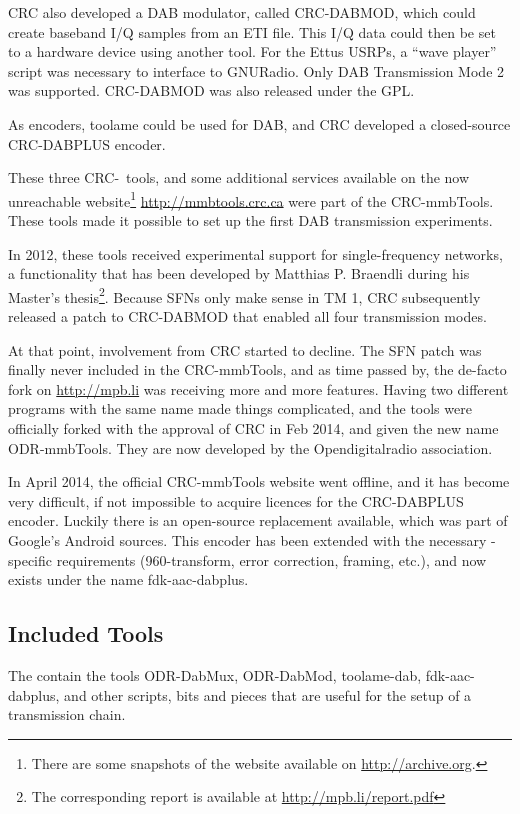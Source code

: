 CRC also developed a DAB modulator, called \mbox{CRC-DABMOD}, which could create
baseband I/Q samples from an ETI file. This I/Q data could then be set to
a hardware device using another tool. For the Ettus USRPs, a ``wave player''
script was necessary to interface to GNURadio. Only DAB Transmission Mode 2 was
supported. \mbox{CRC-DABMOD} was also released under the GPL.

As encoders, toolame could be used for DAB, and CRC developed a closed-source
\mbox{CRC-DABPLUS} \dabplus encoder.

These three CRC-~tools, and some additional services available on the now
unreachable website\footnote{There are some snapshots of the website available
    on \url{http://archive.org}.} \url{http://mmbtools.crc.ca} were
part of the \mbox{CRC-mmbTools}. These tools made it possible to set up the
first DAB transmission experiments.

In 2012, these tools received experimental support for single-frequency
networks, a functionality that has been developed by Matthias P. Braendli during
his Master's thesis\footnote{The corresponding report is available at
    \url{http://mpb.li/report.pdf}}.
Because SFNs only make sense in TM 1, CRC subsequently released a patch to
\mbox{CRC-DABMOD} that enabled all four transmission modes.

At that point, involvement from CRC started to decline. The SFN patch was
finally never included in the \mbox{CRC-mmbTools}, and as time passed by, the
de-facto fork on \url{http://mpb.li} was receiving more and more features.
Having two different programs with the same name made things complicated, and
the tools were officially forked with the approval of CRC in Feb 2014, and given
the new name \mbox{ODR-mmbTools}. They are now developed by the Opendigitalradio
association.

In April 2014, the official \mbox{CRC-mmbTools} website went offline, and it has
become very difficult, if not impossible to acquire licences for the
\mbox{CRC-DABPLUS} encoder. Luckily there is an open-source replacement
available, which was part of Google's Android sources. This encoder has been
extended with the necessary \dabplus{}-specific requirements (960-transform,
error correction, framing, etc.), and now exists under the name
\mbox{fdk-aac-dabplus}.

\subsection{Included Tools}
The \mmbtools contain the tools \mbox{ODR-DabMux}, \mbox{ODR-DabMod},
\mbox{toolame-dab}, \mbox{fdk-aac-dabplus}, and other scripts, bits and pieces
that are useful for the setup of a transmission chain.

